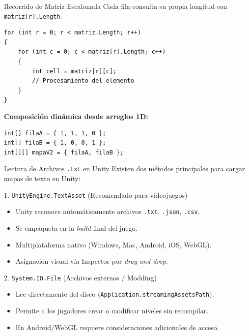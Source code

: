 \documentclass{beamer}
\begin{document}
\begin{frame}[fragile]{Recorrido de Matriz Escalonada}
\lstset{style=CSharpStyle}
Cada fila consulta su propia longitud con \texttt{matriz[r].Length}:

\begin{lstlisting}
for (int r = 0; r < matriz.Length; r++)
{
    for (int c = 0; c < matriz[r].Length; c++)
    {
        int cell = matriz[r][c];
        // Procesamiento del elemento
    }
}
\end{lstlisting}

\vspace{0.3cm}
\textbf{Composici\'on din\'amica desde arreglos 1D:}
\begin{lstlisting}
int[] filaA = { 1, 1, 1, 0 };
int[] filaB = { 1, 0, 0, 1 };
int[][] mapaV2 = { filaA, filaB };
\end{lstlisting}
\end{frame}

\begin{frame}{Lectura de Archivos \texttt{.txt} en Unity}
  Existen dos m\'etodos principales para cargar mapas de texto en Unity:

  \vspace{0.3cm}
  \begin{block}{1. \texttt{UnityEngine.TextAsset} (Recomendado para videojuegos)}
    \begin{itemize}
      \item Unity reconoce autom\'aticamente archivos \texttt{.txt}, \texttt{.json}, \texttt{.csv}.
      \item Se empaqueta en la \textit{build} final del juego.
      \item Multiplataforma nativo (Windows, Mac, Android, iOS, WebGL).
      \item Asignaci\'on visual v\'ia Inspector por \textit{drag and drop}.
    \end{itemize}
  \end{block}

  \begin{block}{2. \texttt{System.IO.File} (Archivos externos / Modding)}
    \begin{itemize}
      \item Lee directamente del disco (\texttt{Application.streamingAssetsPath}).
      \item Permite a los jugadores crear o modificar niveles sin recompilar.
      \item En Android/WebGL requiere consideraciones adicionales de acceso.
    \end{itemize}
  \end{block}
\end{frame}
\end{document}
